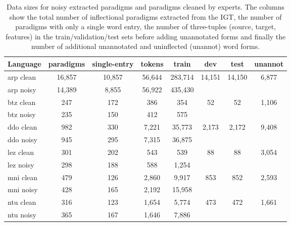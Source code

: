 \begin{table}[]
    \centering
    \begin{tabular}{l|ccccccc}
       \textbf{Language} & \textbf{paradigms} & \textbf{single-entry} & \textbf{tokens} & \textbf{train} & \textbf{dev} & \textbf{test} & \textbf{unannot}  \\
       \hline
       arp clean & 16,857 & 10,857 & 56,644 & 283,714 & \multirow{2}{*}{14,151} & \multirow{2}{*}{14,150} & \multirow{2}{*}{6,877} \\
       arp noisy & 14,389 & 8,855 & 56,922 & 435,430 & & &  \\
       \hline
       btz clean & 247 & 172 & 386 & 354 & \multirow{2}{*}{52}  & \multirow{2}{*}{52} & \multirow{2}{*}{1,106} \\
       btz noisy & 235 & 150 & 412 & 575 & & & \\
       \hline
       ddo clean & 982 & 330 & 7,221 & 35,773 & \multirow{2}{*}{2,173} & \multirow{2}{*}{2,172} & \multirow{2}{*}{9,408} \\
       ddo noisy & 945 & 295 & 7,315 & 36,875 & & &  \\
       \hline
       lez clean & 301 & 202 & 543 & 539 & \multirow{2}{*}{88} & \multirow{2}{*}{88} & \multirow{2}{*}{3,054} \\
       lez noisy & 298 & 188 & 588 & 1,254 &  &  &  \\
       \hline
       mni clean & 479 & 126 & 2,860 & 9,917 & \multirow{2}{*}{853} & \multirow{2}{*}{852} & \multirow{2}{*}{2,593}\\
       mni noisy & 428 & 165 & 2,192 & 15,958 &  &  &  \\
       \hline
       ntu clean & 316 & 123 & 1,654 & 5,774 & \multirow{2}{*}{473} & \multirow{2}{*}{472} & \multirow{2}{*}{1,661} \\
       ntu noisy & 365 & 167 & 1,646 & 7,886 &  &  &  \\
     
    \end{tabular}
    \caption[IGT2P data]{Data sizes for noisy extracted paradigms and paradigms cleaned by experts. The columns show the total number of inflectional paradigms extracted from the IGT, the number of paradigms with only a single word entry, the number of three-tuples (source, target, features) in the train/validation/test sets before adding unannotated forms and finally the number of additional unannotated and uninflected (unannot) word forms.}
    \label{tab:IGT2Pdata}
\end{table}


